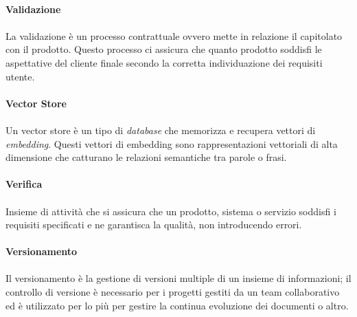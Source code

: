 \documentclass[10pt, a4paper]{article}
\begin{document}
\paragraph{Validazione}\noindent\hrulefill
\paragraph{}La validazione è un processo contrattuale ovvero mette in relazione il capitolato con il prodotto. Questo processo ci assicura che quanto prodotto soddisfi le aspettative del cliente finale secondo la corretta individuazione dei requisiti utente.

\vspace{2em}
\paragraph{Vector Store}\noindent\hrulefill
\paragraph{}Un vector store è un tipo di \textit{database\pg} che memorizza e recupera vettori di \textit{embedding\pg}. Questi vettori di embedding sono rappresentazioni vettoriali di alta dimensione che catturano le relazioni semantiche tra parole o frasi.

\vspace{2em}
\paragraph{Verifica}\noindent\hrulefill
\paragraph{}Insieme di attività che si assicura che un prodotto, sistema o servizio soddisfi i requisiti specificati e ne garantisca la qualità, non introducendo errori.


\vspace{2em}
\paragraph{Versionamento}\noindent\hrulefill
\paragraph{}Il versionamento è la gestione di versioni multiple di un insieme di informazioni; il controllo di versione è necessario
per i progetti gestiti da un team collaborativo ed è utilizzato per lo più per gestire la continua evoluzione dei documenti o altro.
\end{document}
